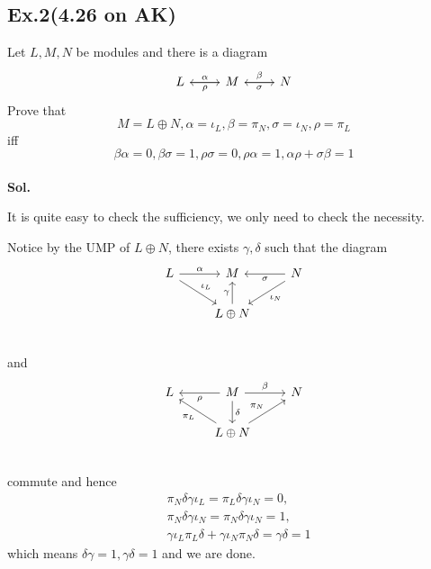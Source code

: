 \documentclass[lang=en,11pt,a4paper,citestyle =authoryear]{elegantpaper}
\begin{document}
\subsection*{Ex.2(4.26 on AK)} 
Let $L,M,N$ be modules and there is a diagram
\[
\begin{tikzcd}
L\arrow[r,"\alpha"] & M\arrow[r,"\beta"]\arrow[l,"\rho"] & N\arrow[l,"\sigma"]
\end{tikzcd}
\]
Prove that
\[M = L\oplus N,\alpha= \iota_L,\beta = \pi_N,\sigma = \iota_N, \rho = \pi_L\]
iff
\[
\beta\alpha = 0, \beta\sigma = 1,\rho\sigma = 0, \rho\alpha = 1, \alpha\rho+\sigma\beta = 1
\]
\vspace{0.5em}\\
\textbf{Sol.} \par
It is quite easy to check the sufficiency, we only need to check the necessity.\par
Notice by the UMP of $L\oplus N$, there exists $\gamma,\delta$ such that the diagram
\[
\begin{tikzcd}
    L\arrow[rd,"\iota_L"]\arrow[r,"\alpha"] & M & N\arrow[ld,"\iota_N"]\arrow[l,"\sigma"] \\
     & L\oplus N\arrow[u,"\gamma"] & \\
\end{tikzcd}
\]
and
\[
\begin{tikzcd}
    L & M\arrow[l,"\rho"]\arrow[r,"\beta"]\arrow[d,"\delta"] & N \\
     & L\oplus N\arrow[lu,"\pi_L"]\arrow[ru,"\pi_N"] & \\
\end{tikzcd}
\]
commute and hence
\[
\begin{aligned}
    &\pi_N\delta\gamma\iota_L = \pi_L\delta\gamma\iota_N = 0,  \\
    &\pi_N\delta\gamma\iota_N = \pi_N\delta\gamma\iota_N = 1,
    \\
    &\gamma\iota_L\pi_L\delta + \gamma\iota_N\pi_N\delta = \gamma\delta = 1
\end{aligned}
\]
which means $\delta\gamma = 1, \gamma\delta = 1$ and we are done.
\par 
\vspace{0.5em}
\end{document}
